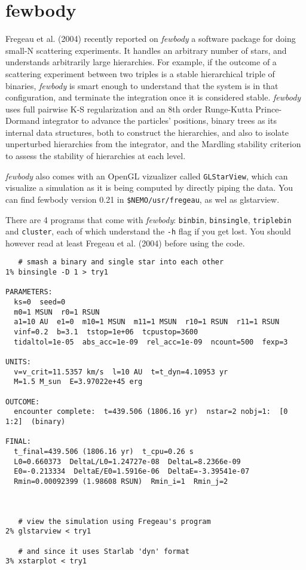 \section{fewbody}

Fregeau et al. (2004) recently reported on
{\it fewbody} a software package for doing
small-N scattering experiments. It handles an arbitrary number of stars,
and understands arbitrarily large hierarchies. For example, if the
outcome of a scattering experiment between two triples is a stable
hierarchical triple of binaries, {\it fewbody} is smart enough to
understand that the system is in that configuration, and terminate the
integration once it is considered stable. {\it fewbody} uses full pairwise
K-S regularization and an 8th order Runge-Kutta Prince-Dormand
integrator to advance the particles' positions, binary trees as its
internal data structures, both to construct the hierarchies, and also
to isolate unperturbed hierarchies from the integrator, and the
Mardling stability criterion to assess the stability of hierarchies at
each level.

{\it fewbody} also comes with an OpenGL vizualizer called {\tt GLStarView},
which can visualize a simulation as it is being computed by directly
piping the data. You can find fewbody  version 0.21 in {\tt \$NEMO/usr/fregeau},
as wel as glstarview.

There are  4 programs that come with {\it fewbody}:
{\tt binbin}, {\tt binsingle}, {\tt triplebin} and {\tt cluster},
 each of which understand the
{\tt -h} flag if you get lost. You should however read at least
Fregeau et al. (2004) before using the code.

\footnotesize\begin{verbatim}
   # smash a binary and single star into each other
1% binsingle -D 1 > try1

PARAMETERS:
  ks=0  seed=0
  m0=1 MSUN  r0=1 RSUN
  a1=10 AU  e1=0  m10=1 MSUN  m11=1 MSUN  r10=1 RSUN  r11=1 RSUN
  vinf=0.2  b=3.1  tstop=1e+06  tcpustop=3600
  tidaltol=1e-05  abs_acc=1e-09  rel_acc=1e-09  ncount=500  fexp=3
 
UNITS:
  v=v_crit=11.5357 km/s  l=10 AU  t=t_dyn=4.10953 yr
  M=1.5 M_sun  E=3.97022e+45 erg
 
OUTCOME:
  encounter complete:  t=439.506 (1806.16 yr)  nstar=2 nobj=1:  [0 1:2]  (binary)
 
FINAL:
  t_final=439.506 (1806.16 yr)  t_cpu=0.26 s
  L0=0.660373  DeltaL/L0=1.24727e-08  DeltaL=8.2366e-09
  E0=-0.213334  DeltaE/E0=1.5916e-06  DeltaE=-3.39541e-07
  Rmin=0.00092399 (1.98608 RSUN)  Rmin_i=1  Rmin_j=2



   # view the simulation using Fregeau's program
2% glstarview < try1

   # and since it uses Starlab 'dyn' format
3% xstarplot < try1

\end{verbatim}\normalsize

